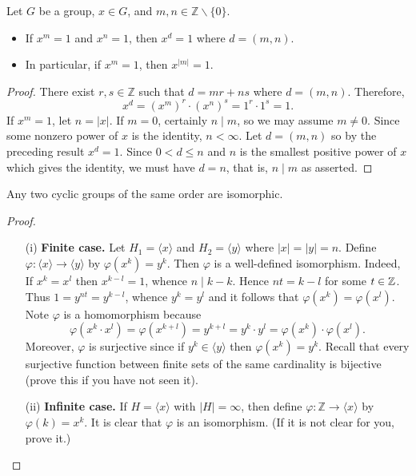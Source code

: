 \documentclass[11pt,a4paper]{article}
\begin{document}
\begin{prop}
    Let \( G \) be a group, \( x \in G \), and \( m, n \in \mathbb{Z} \backslash \{0\} \).
\begin{itemize}
    \item If \( x^m = 1 \) and \( x^n = 1 \), then \( x^d = 1 \) where \( d = (m, n) \).
    \item In particular, if \( x^m = 1 \), then \( x^{\lvert m \rvert} = 1 \).
\end{itemize}
\end{prop}



\begin{proof}
    There exist \( r, s \in \mathbb{Z} \) such that \( d = mr + ns \) where \( d = (m, n) \).
    Therefore, \[ x^d = (x^m)^r \cdot (x^n)^s = 1^r \cdot 1^s = 1 .\]
    If \( x^m = 1 \), let \( n = |x| \). If \( m = 0 \), certainly \( n \mid m \), so we may assume \( m \neq 0 \). Since some nonzero power of \( x \) is the identity, \( n < \infty \). Let \( d = (m, n) \) so by the preceding result \( x^d = 1 \). Since \( 0 < d \leq n \) and \( n \) is the smallest positive power of \( x \) which gives the identity, we must have \( d = n \), that is, \( n \mid m \) as asserted.

\end{proof}

 
\begin{teo}
    Any two cyclic groups of the same order are isomorphic.
\end{teo}

\begin{proof}
    
\begin{enumerate}[label=(\roman*)]
    \item[(i)] \textbf{Finite case.}
    Let \( H_1 = \langle x \rangle \) and \( H_2 = \langle y \rangle \) where \( |x| = |y| = n \).
    Define \( \varphi: \langle x \rangle \to \langle y \rangle \) by \( \varphi(x^k) = y^k \).
    Then \( \varphi \) is a well-defined isomorphism. Indeed, If \( x^k = x^l \) then \(x^{k-l} = 1\), whence \(n\mid k-k\). Hence \(nt = k-l\) for some \(t\in\mathbb{Z}\). Thus \(1 = y^{nt} = y^{k-l} \), whence \(y^k=y^l\) and it follows that  \( \varphi(x^k) = \varphi(x^l) \).
    Note \(\varphi\)  is a homomorphism because \[\varphi(x^k \cdot x^l) = \varphi(x^{k+l}) = y^{k+l} = y^k \cdot y^l = \varphi(x^k) \cdot \varphi(x^l).\] 
    Moreover, \(\varphi\) is surjective since if \( y^k \in \langle y \rangle \) then \( \varphi(x^k) = y^k \).
    Recall that every surjective function between finite sets of the same cardinality is bijective (prove this if you have not seen it). 
    \item[(ii)] \textbf{Infinite case.}
    If \( H = \langle x \rangle \) with \( |H| = \infty \), then define \( \varphi\colon  \mathbb{Z} \to \langle x \rangle \) by \( \varphi(k) = x^k \).
    It is clear that 
    \( \varphi \) is an isomorphism. (If it is not clear for you, prove it.)
\end{enumerate}
\end{proof}
\end{document}
